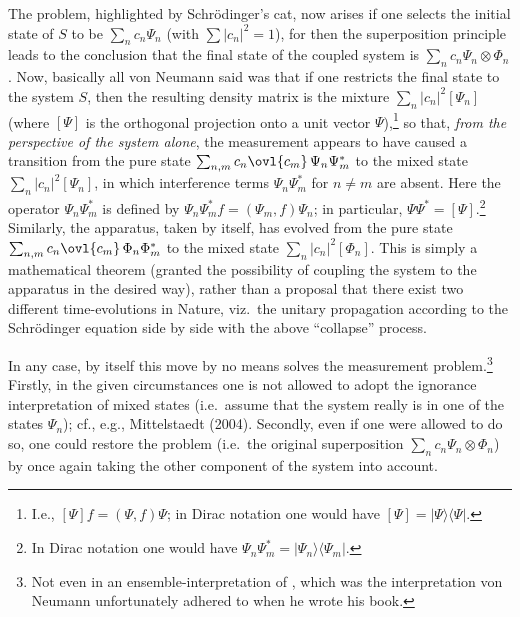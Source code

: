 \documentclass[12pt,titlepage]{article}
\newcommand{\ot}{\otimes}
\begin{document}
The problem, highlighted by Schr\"{o}dinger's cat,  now arises if one selects the initial state of $S$ to be $\sum_n c_n \Psi_n$ (with $\sum |c_n|^2=1$), for then the superposition principle leads to the conclusion that the final state of the coupled system is $\sum_n c_n \Psi_n \ot\Phi_n$. 
 Now, basically all von Neumann said was that if one restricts the final state to the  system $S$, then the resulting density matrix is the mixture $\sum_n |c_n|^2 
 [\Psi_n]$ (where $[\Psi]$ is the orthogonal projection onto a unit vector $\Psi$),\footnote{I.e., $[\Psi]f=(\Psi,f)\Psi$; in Dirac notation one would have $[\Psi]=|\Psi\rangle\langle\Psi|$.} so that, {\it from the perspective of the system alone}, the measurement appears to have caused a transition from the pure state
 $\sum_{n,m} c_n\ovl{c_m}\, \Psi_n\Psi_m^*$
 to the mixed state 
 $\sum_n |c_n|^2 [\Psi_n]$, in which interference terms $\Psi_n\Psi_m^*$ for $n\neq m$
are absent. Here the operator $\Psi_n\Psi_m^*$ is defined by $\Psi_n\Psi_m^*f=(\Psi_m,f)\Psi_n$; in particular, $\Psi\Psi^*=[\Psi]$.\footnote{In
Dirac notation one would have  $\Psi_n\Psi_m^*=|\Psi_n\rangle\langle\Psi_m|$. }
 Similarly, the apparatus, taken by itself, has evolved from  the pure state $\sum_{n,m} c_n\ovl{c_m}\, \Phi_n\Phi^*_m$ to the mixed state 
 $\sum_n |c_n|^2  [\Phi_n]$. This is simply a mathematical theorem (granted the possibility of coupling the system to the apparatus in the desired way), rather than a proposal that there exist two different time-evolutions in Nature, viz.\ the unitary propagation according to the Schr\"{o}dinger equation side by side with the above ``collapse'' process.

In any case, by itself this move by no means solves the measurement problem.\footnote{Not even  in an ensemble-interpretation of \qm, which was the interpretation von Neumann unfortunately adhered to when he wrote his book.}  
Firstly, in the given circumstances one is not allowed to adopt the ignorance interpretation of mixed states (i.e.\ assume that the system really is in one of the states $\Psi_n$); cf., e.g., Mittelstaedt (2004). Secondly, even if one were allowed to do so, one could restore the problem (i.e.\ the original superposition $\sum_n c_n \Psi_n\ot \Phi_n$) by once again taking the other component of the system into account. 
\end{document}
